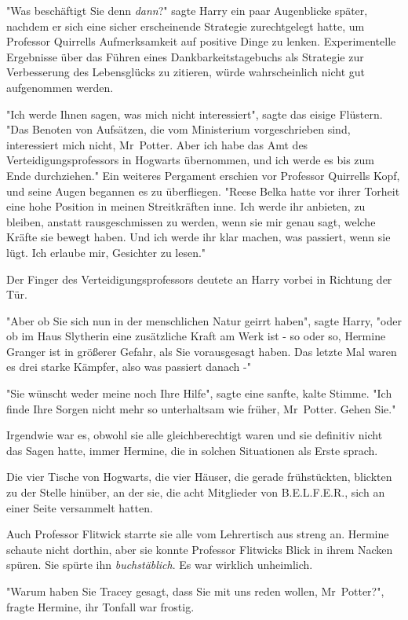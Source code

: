{"Was beschäftigt Sie denn \emph{dann}?" sagte Harry ein paar Augenblicke später, nachdem er sich eine sicher erscheinende Strategie zurechtgelegt hatte, um Professor Quirrells Aufmerksamkeit auf positive Dinge zu lenken. Experimentelle Ergebnisse über das Führen eines Dankbarkeitstagebuchs als Strategie zur Verbesserung des Lebensglücks zu zitieren, würde wahrscheinlich nicht gut aufgenommen werden.

"Ich werde Ihnen sagen, was mich nicht interessiert", sagte das eisige Flüstern. "Das Benoten von Aufsätzen, die vom Ministerium vorgeschrieben sind, interessiert mich nicht, Mr~Potter. Aber ich habe das Amt des Verteidigungsprofessors in Hogwarts übernommen, und ich werde es bis zum Ende durchziehen." Ein weiteres Pergament erschien vor Professor Quirrells Kopf, und seine Augen begannen es zu überfliegen. "Reese Belka hatte vor ihrer Torheit eine hohe Position in meinen Streitkräften inne. Ich werde ihr anbieten, zu bleiben, anstatt rausgeschmissen zu werden, wenn sie mir genau sagt, welche Kräfte sie bewegt haben. Und ich werde ihr klar machen, was passiert, wenn sie lügt. Ich erlaube mir, Gesichter zu lesen."

Der Finger des Verteidigungsprofessors deutete an Harry vorbei in Richtung der Tür.

"Aber ob Sie sich nun in der menschlichen Natur geirrt haben", sagte Harry, "oder ob im Haus Slytherin eine zusätzliche Kraft am Werk ist - so oder so, Hermine Granger ist in größerer Gefahr, als Sie vorausgesagt haben. Das letzte Mal waren es drei starke Kämpfer, also was passiert danach -"

"Sie wünscht weder meine noch Ihre Hilfe", sagte eine sanfte, kalte Stimme. "Ich finde Ihre Sorgen nicht mehr so unterhaltsam wie früher, Mr~Potter. Gehen Sie."

Irgendwie war es, obwohl sie alle gleichberechtigt waren und sie definitiv nicht das Sagen hatte, immer Hermine, die in solchen Situationen als Erste sprach.

Die vier Tische von Hogwarts, die vier Häuser, die gerade frühstückten, blickten zu der Stelle hinüber, an der sie, die acht Mitglieder von B.E.L.F.E.R., sich an einer Seite versammelt hatten.

Auch Professor Flitwick starrte sie alle vom Lehrertisch aus streng an. Hermine schaute nicht dorthin, aber sie konnte Professor Flitwicks Blick in ihrem Nacken spüren. Sie spürte ihn \emph{buchstäblich}. Es war wirklich unheimlich.

"Warum haben Sie Tracey gesagt, dass Sie mit uns reden wollen, Mr~Potter?", fragte Hermine, ihr Tonfall war frostig.

}
